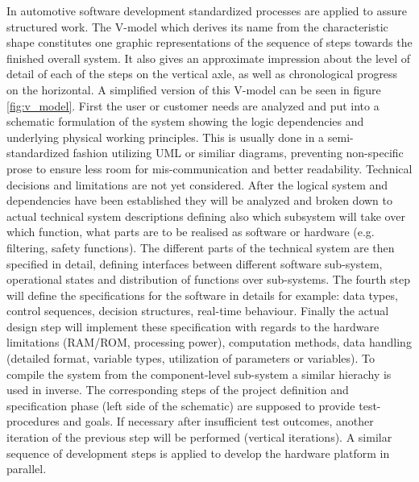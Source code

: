 \documentclass[ExampleMasters.tex]{subfiles}
\begin{document}
In automotive software development standardized processes are applied to assure structured work. The V-model which derives its name from the characteristic shape constitutes one graphic representations of the sequence of steps towards the finished overall system. It also gives an approximate impression about the level of detail of each of the steps on the vertical axle, as well as chronological progress on the horizontal. A simplified version of this V-model can be seen in figure \ref{fig:v_model}. First the user or customer needs are analyzed and put into a schematic formulation of the system showing the logic dependencies and underlying physical working principles. This is usually done in a semi-standardized fashion utilizing \gls{UML} or similiar diagrams, preventing non-specific prose to ensure less room for mis-communication and better readability. Technical decisions and limitations are not yet considered. After the logical system and dependencies have been established they will be analyzed and broken down to actual technical system descriptions defining also which subsystem will take over which function, what parts are to be realised as software or hardware (e.g. filtering, safety functions). The different parts of the technical system are then specified in detail, defining interfaces between different software sub-system, operational states and distribution of functions over sub-systems. The fourth step will define the specifications for the software in details for example: data types, control sequences, decision structures, real-time behaviour. Finally the actual design step will implement these specification with regards to the hardware limitations (RAM/ROM, processing power), computation methods, data handling (detailed format, variable types, utilization of parameters or variables). To compile the system from the component-level sub-system a similar hierachy is used in inverse. The corresponding steps of the project definition and specification phase (left side of the schematic) are supposed to provide test-procedures and goals. If necessary after insufficient test outcomes, another iteration of the previous step will be performed (vertical iterations). A similar sequence of development steps is applied to develop the hardware platform in parallel.\cite{automotive_software_engineering}
\end{document}
